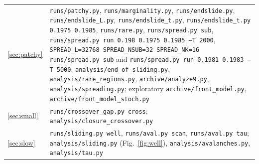 \documentclass[10pt,a4paper]{article}
\begin{document}
\begin{center}
\begin{tabular}{p{3.4cm}p{12cm}}
\ref{sec:patchy} & \texttt{runs/patchy.py}, \texttt{runs/marginality.py}, \texttt{runs/endslide.py}, \texttt{runs/endslide\_L.py}, \texttt{runs/endslide\_t.py}, \texttt{runs/endslide\_t.py 0.1975 0.1985}, \texttt{runs/rare.py}, \texttt{runs/spread.py sub}, \texttt{runs/spread.py run 0.198 0.1975 0.1985 --T 2000}, \texttt{SPREAD\_L=32768 SPREAD\_NSUB=32 SPREAD\_NK=16 runs/spread.py sub} and \texttt{runs/spread.py run 0.1981 0.1983 --T 5000}; \texttt{analysis/end\_of\_sliding.py}, \texttt{analysis/rare\_regions.py}, \texttt{archive/analyze9.py}, \texttt{analysis/spreading.py}; exploratory \texttt{archive/front\_model.py}, \texttt{archive/front\_model\_stoch.py} \\
\ref{sec:small} & \texttt{runs/crossover\_gap.py cross}; \texttt{analysis/closure\_crossover.py} \\
\ref{sec:slow} & \texttt{runs/sliding.py well}, \texttt{runs/aval.py scan}, \texttt{runs/aval.py tau}; \texttt{analysis/sliding.py} (Fig.~\ref{fig:well}), \texttt{analysis/avalanches.py}, \texttt{analysis/tau.py} \\
\bottomrule
\end{tabular}
\end{center}
\end{document}
